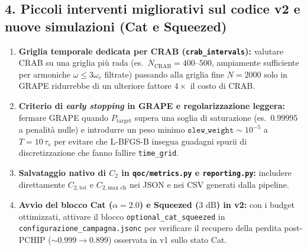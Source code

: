 \documentclass[11pt,a4paper]{article}
\begin{document}
\subsection*{4. Piccoli interventi migliorativi sul codice v2 e nuove simulazioni (Cat e Squeezed)}
\begin{enumerate}
    \item \textbf{Griglia temporale dedicata per CRAB (\texttt{crab\_intervals}):} valutare CRAB su una griglia più rada (es.\ $N_{\text{CRAB}} = 400\text{--}500$, ampiamente sufficiente per armoniche $\omega \le 3\omega_c$ filtrate) passando alla griglia fine $N=2000$ solo in GRAPE ridurrebbe di un ulteriore fattore $4\times$ il costo di CRAB.
    \item \textbf{Criterio di \emph{early stopping} in GRAPE e regolarizzazione leggera:} fermare GRAPE quando $P_{\text{target}}$ supera una soglia di saturazione (es.\ $0.99995$ a penalità nulle) e introdurre un peso minimo $\texttt{slew\_weight} \sim 10^{-5}$ a $T=10\,\tau_s$ per evitare che L-BFGS-B insegua guadagni spurii di discretizzazione che fanno fallire \texttt{time\_grid}.
    \item \textbf{Salvataggio nativo di $C_2$ in \texttt{qoc/metrics.py} e \texttt{reporting.py}:} includere direttamente $C_{2,\text{tot}}$ e $C_{2,\text{max ch}}$ nei JSON e nei CSV generati dalla pipeline.
    \item \textbf{Avvio del blocco Cat ($\alpha=2.0$) e Squeezed ($3\text{ dB}$) in v2:} con i budget ottimizzati, attivare il blocco \texttt{optional\_cat\_squeezed} in \texttt{configurazione\_campagna.jsonc} per verificare il recupero della perdita post-PCHIP ($\sim 0.999 \to 0.899$) osservata in v1 sullo stato Cat.
\end{enumerate}
\end{document}
